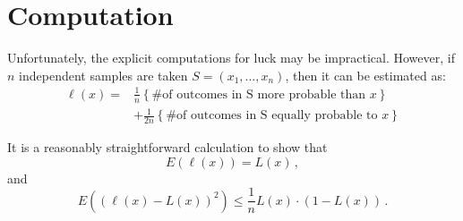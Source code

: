 \chapter*{Computation}

Unfortunately, the explicit computations for luck may be impractical.  However, if $n$ independent samples are taken $S=(x_1, \ldots, x_n)$, then it can be estimated as: 
\begin{align*}
 \ell(x) = & \frac{1}{n} \left\{\text{\# of outcomes in S more probable than $x$}\right\}  \\
 & + \frac{1}{2n} \left\{\text{\# of outcomes in S equally probable to $x$}\right\} 
\end{align*}

It is a reasonably straightforward calculation to show that
\begin{equation}
E(\ell(x))=L(x) \,,
\end{equation}
and
\begin{equation}
E((\ell(x)-L(x))^2) \leq \frac{1}{n} L(x) \cdot (1-L(x))\,.
\end{equation}
